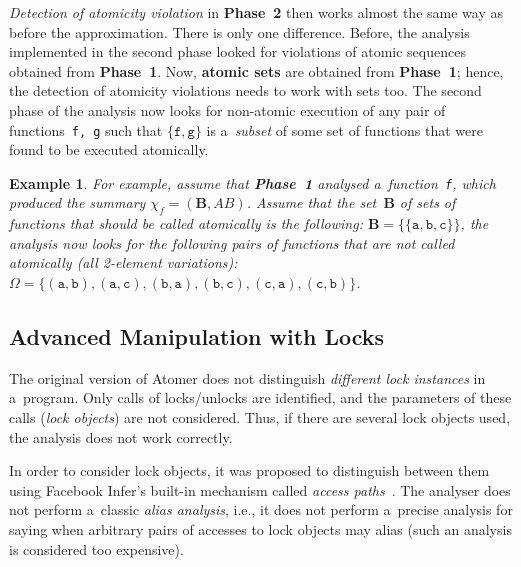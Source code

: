 \documentclass{ExcelAtFIT}
\theoremstyle{example}
\newtheorem{example}{Example}[section]
\begin{document}
\emph{Detection of atomicity violation} in \textbf{Phase~2} then works almost the same way as before the approximation. There is only one difference. Before, the analysis implemented in the second phase looked for violations of atomic sequences obtained from \textbf{Phase~1}. Now, \textbf{atomic sets} are obtained from \textbf{Phase~1}; hence, the detection of atomicity violations needs to work with sets too. The second phase of the analysis now looks for non-atomic execution of any pair of functions~\texttt{f,~g} such that ${ \{\mathtt{f, g}\} }$ is a~\emph{subset} of some set of functions that were found to be executed atomically.

\begin{example}
    \sloppy
    For example, assume that \textbf{Phase~1} analysed a~function~\texttt{f}, which produced the summary $ \chi_f = {(\boldsymbol{B}, AB)} $. Assume that the set~$ \boldsymbol{B} $ of sets of functions that should be called atomically is the following: $ \boldsymbol{B} = \{{\{\mathtt{a}, \mathtt{b}, \mathtt{c}\}}\} $, the analysis now looks for the following pairs of functions that are not called atomically (all 2-element variations): $ \Omega = \{{(\mathtt{a}, \mathtt{b})}, {(\mathtt{a}, \mathtt{c})}, {(\mathtt{b}, \mathtt{a})}, {(\mathtt{b}, \mathtt{c})}, {(\mathtt{c}, \mathtt{a})}, {(\mathtt{c}, \mathtt{b})}\} $.
\end{example}

\subsection{Advanced Manipulation with Locks}

The original version of Atomer does not distinguish \emph{different lock instances} in a~program. Only calls of locks/unlocks are identified, and the parameters of these calls (\emph{lock objects}) are not considered. Thus, if there are several lock objects used, the analysis does not work correctly.

In order to consider lock objects, it was proposed to distinguish between them using Facebook Infer's built-in mechanism called \emph{access paths}~\cite{accessPath}. The analyser does not perform a~classic \emph{alias analysis}, i.e., it does not perform a~precise analysis for saying when arbitrary pairs of accesses to lock objects may alias (such an analysis is considered too expensive).
\end{document}

